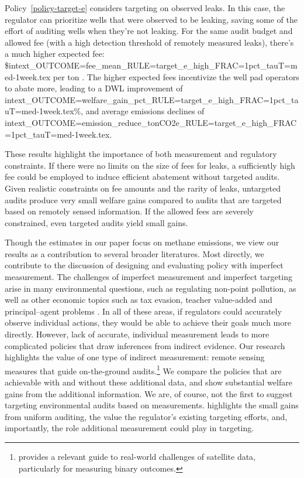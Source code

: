 Policy~\ref{policy-target-e} considers targeting on observed leaks.
In this case, the regulator can prioritize wells that were observed to be leaking, saving some of the effort of auditing wells when they're not leaking.
For the same audit budget and allowed fee (with a high detection threshold of remotely measured leaks), there's a much higher expected fee:
\${intext_OUTCOME=fee_mean_RULE=target_e_high_FRAC=1pct_tauT=med-1week.tex} per ton .
The higher expected fees incentivize the well pad operators to abate more, leading to
a \gls{DWL} improvement of
{intext_OUTCOME=welfare_gain_pct_RULE=target_e_high_FRAC=1pct_tauT=med-1week.tex}\%,
and average emissions declines of
{intext_OUTCOME=emission_reduce_tonCO2e_RULE=target_e_high_FRAC=1pct_tauT=med-1week.tex}.


These results highlight the importance of both measurement and regulatory constraints.
If there were no limits on the size of fees for leaks, a sufficiently high fee could be employed to induce efficient abatement without targeted audits.
Given realistic constraints on fee amounts and the rarity of leaks, untargeted audits produce very small welfare gains compared to audits that are targeted based on remotely sensed information.
If the allowed fees are severely constrained, even targeted audits yield small gains.

Though the estimates in our paper focus on methane emissions, we view our results as a contribution to several broader literatures.
Most directly, we contribute to the discussion of designing and evaluating policy with imperfect measurement.
The challenges of imperfect measurement and imperfect targeting arise in many environmental questions, such as regulating non-point pollution, as well as other economic topics such as tax evasion, teacher value-added and principal--agent problems
\parencite{%
Harrington:1988,
Segerson:1988,
Allingham/Sandmo:1972,
Chetty/Friedman/Rockoff:2014,
Gilpatric/Vossler/McKee:2011,
gilpatric2015using,
cason2016regulatory,
oestreich2015firms,
Oestreich:2017,
}.
In all of these areas, if regulators could accurately observe individual actions, they would be able to achieve their goals much more directly.
However, lack of accurate, individual measurement leads to more complicated policies that draw inferences from indirect evidence.
Our research highlights the value of one type of indirect measurement: remote sensing measures that guide on-the-ground audits.\footnote{%
\textcite{AlixGarcia/Millimet:2022} provides a relevant guide to real-world challenges of satellite data, particularly for measuring binary outcomes.
}
We compare the policies that are achievable with and without these additional data, and show substantial welfare gains from the additional information.
We are, of course, not the first to suggest targeting environmental audits based on measurements.
\textcite{Duflo/Greenstone/Pande/Ryan:2018} highlights the small gains from uniform auditing, the value the regulator's existing targeting efforts, and, importantly, the role additional measurement could play in targeting.

